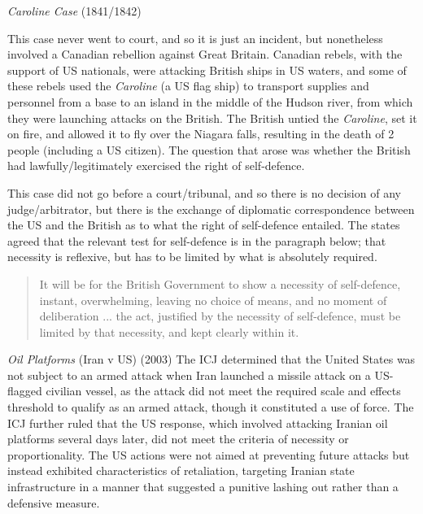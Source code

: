 \begin{casedetails}{\textit{Caroline Case} (1841/1842)}
    \flushleft

    This case never went to court, and so it is just an incident, but nonetheless involved a Canadian rebellion against Great Britain. Canadian rebels, with the support of US nationals, were attacking British ships in US waters, and some of these rebels used the \textit{Caroline} (a US flag ship) to transport supplies and personnel from a base to an island in the middle of the Hudson river, from which they were launching attacks on the British. The British untied the \textit{Caroline}, set it on fire, and allowed it to fly over the Niagara falls, resulting in the death of 2 people (including a US citizen). The question that arose was whether the British had lawfully/legitimately exercised the right of self-defence.

    \vspace{\baselineskip}

    This case did not go before a court/tribunal, and so there is no decision of any judge/arbitrator, but there is the exchange of diplomatic correspondence between the US and the British as to what the right of self-defence entailed. The states agreed that the relevant test for self-defence is in the paragraph below; that necessity is reflexive, but has to be limited by what is absolutely required.

    \begin{quote}
        It will be for the British Government to show a necessity of self-defence, instant, overwhelming, leaving no choice of means, and no moment of deliberation ... the act, justified by the necessity of self-defence, must be limited by that necessity, and kept clearly within it.
    \end{quote}
\end{casedetails}

\begin{casedetails}{\textit{Oil Platforms} (Iran v US) (2003)}
    \flushleft
    The ICJ determined that the United States was not subject to an armed attack when Iran launched a missile attack on a US-flagged civilian vessel, as the attack did not meet the required scale and effects threshold to qualify as an armed attack, though it constituted a use of force. The ICJ further ruled that the US response, which involved attacking Iranian oil platforms several days later, did not meet the criteria of necessity or proportionality. The US actions were not aimed at preventing future attacks but instead exhibited characteristics of retaliation, targeting Iranian state infrastructure in a manner that suggested a punitive lashing out rather than a defensive measure.
\end{casedetails}

